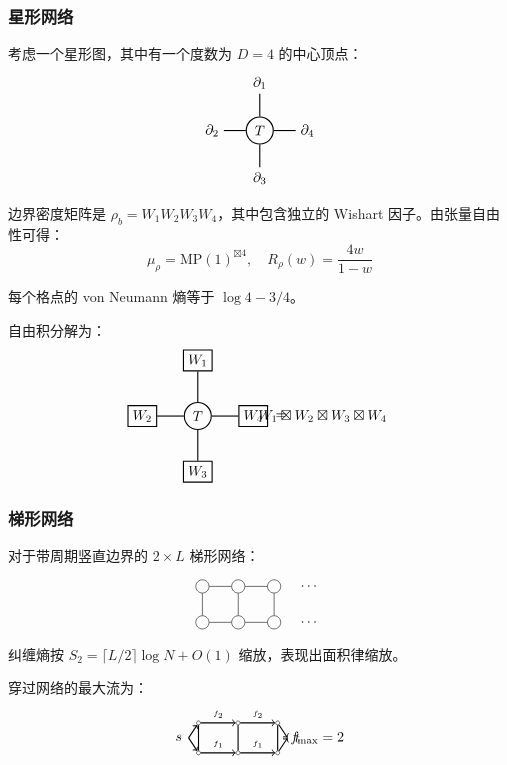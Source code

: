 \subsubsection{星形网络}
考虑一个星形图，其中有一个度数为 $D = 4$ 的中心顶点：
\[
\begin{tikzpicture}[baseline=0, scale=0.8]
   \node[circle, draw, thick] (C) at (0,0) {$T$};
   \foreach \i in {1,2,3,4} {
      \node (B\i) at (90*\i:1.5) {$\partial_\i$};
      \draw[thick] (C) -- (B\i);
   }
\end{tikzpicture}
\]

边界密度矩阵是 $\rho_b = W_1 W_2 W_3 W_4$，其中包含独立的 Wishart 因子。由张量自由性可得：
\[
   \mu_{\rho} = \mathrm{MP}(1)^{\boxtimes 4}, \quad R_{\rho}(w) = \frac{4w}{1-w}
\]

每个格点的 von Neumann 熵等于 $\log 4 - 3/4$。

自由积分解为：
\[
\begin{tikzpicture}[baseline=0, scale=0.7]
   \node[circle, draw, thick] (C) at (0,0) {$T$};
   \foreach \i in {1,2,3,4} {
      \node[draw, thick] (W\i) at (90*\i:2) {$W_{\i}$};
      \draw[thick] (C) -- (W\i);
   }
   \node at (3,0) {$=$};
   \node at (4.5,0) {$W_1 \boxtimes W_2 \boxtimes W_3 \boxtimes W_4$};
\end{tikzpicture}
\]

\subsubsection{梯形网络}
对于带周期竖直边界的 $2 \times L$ 梯形网络：
\[
\begin{tikzpicture}[baseline=0, scale=0.6]
   \foreach \i in {0,1,2} {
      \node[circle, draw] (T\i) at (1.5*\i,0) {};
      \node[circle, draw] (B\i) at (1.5*\i,-1.5) {};
      \draw (T\i) -- (B\i);
   }
   \node at (4.5,0) {$\cdots$};
   \node at (4.5,-1.5) {$\cdots$};
   \foreach \i in {0,1} {
      \draw (T\i) -- (T\the\numexpr\i+1);
      \draw (B\i) -- (B\the\numexpr\i+1);
   }
\end{tikzpicture}
\]

纠缠熵按 $S_2 = \lceil L/2 \rceil \log N + O(1)$ 缩放，表现出面积律缩放。

穿过网络的最大流为：
\[
\begin{tikzpicture}[baseline=0, scale=0.5]
   \foreach \i in {0,1,2} {
      \foreach \j in {0,1} {
         \node[circle, draw, inner sep=1pt] (T\i\j) at (2*\i,1.5*\j) {};
      }
   }
   \foreach \i in {0,1} {
      \draw[thick, ->] (T\i0) -- (T\the\numexpr\i+1\relax0) node[midway, above, font=\tiny] {$f_1$};
      \draw[thick, ->] (T\i1) -- (T\the\numexpr\i+1\relax1) node[midway, above, font=\tiny] {$f_2$};
   }
   \foreach \i in {0,1,2} {
      \draw[thick] (T\i0) -- (T\i1);
   }
   \node at (-1,0.75) {$s$};
   \node at (5,0.75) {$t$};
   \draw[thick, ->] (-0.5,0.75) -- (T00);
   \draw[thick, ->] (-0.5,0.75) -- (T01);
   \draw[thick, ->] (T20) -- (4.5,0.75);
   \draw[thick, ->] (T21) -- (4.5,0.75);
   \node at (6,0.75) {$f_{\max} = 2$};
\end{tikzpicture}
\]

